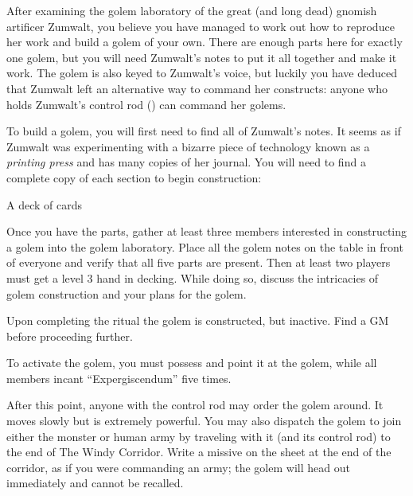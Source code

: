 \documentclass[green]{guildcamp2}
\begin{document}
\name{\gGolem{}}

After examining the golem laboratory of the great (and long dead) gnomish artificer Zumwalt, you believe you have managed to work out how to reproduce her work and build a golem of your own. There are enough parts here for exactly one golem, but you will need Zumwalt's notes to put it all together and make it work. The golem is also keyed to Zumwalt's voice, but luckily you have deduced that Zumwalt left an alternative way to command her constructs: anyone who holds Zumwalt's control rod (\iGolemControlRod{}) can command her golems.

To build a golem, you will first need to find all of Zumwalt's notes. It seems as if Zumwalt was experimenting with a bizarre piece of technology known as a \emph{printing press} and has many copies of her journal. You will need to find a complete copy of each section to begin construction:

\begin{enum}[Requirements]
	\item \iGolemNotesA{}
	\item \iGolemNotesB{}
	\item \iGolemNotesC{}
	\item \iGolemNotesD{}
	\item \iGolemNotesE{}
	\item A deck of cards
\end{enum}

Once you have the parts, gather at least three members interested in constructing a golem into the golem laboratory. Place all the golem notes on the table in front of everyone and verify that all five parts are present. Then at least two players must get a level 3 hand in decking. While doing so, discuss the intricacies of golem construction and your plans for the golem.

Upon completing the ritual the golem is constructed, but inactive. Find a GM before proceeding further.

To activate the golem, you must possess  \iGolemControlRod{} and point it at the golem, while all members incant ``Expergiscendum'' five times.

After this point, anyone with the control rod may order the golem around. It moves slowly but is extremely powerful. You may also dispatch the golem to join either the monster or human army by traveling with it (and its control rod) to the end of The Windy Corridor. Write a missive on the sheet at the end of the corridor, as if you were commanding an army; the golem will head out immediately and cannot be recalled.
\end{document}
